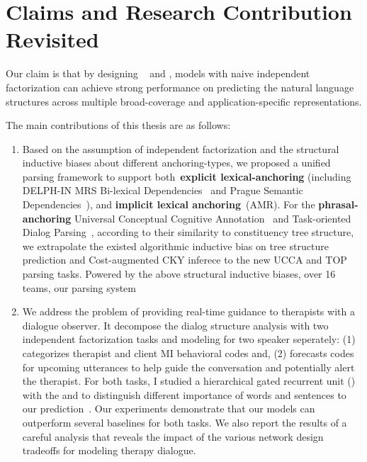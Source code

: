 \section{Claims and Research Contribution Revisited}
\label{sec:conclustions:claims}

 Our claim is that by designing
~ and , models with naive independent factorization can achieve
strong performance on predicting the natural language structures
across multiple broad-coverage and application-specific
representations.

 The main contributions of this thesis are as
follows:

\begin{enumerate}
\item Based on the assumption of independent factorization and the
  structural inductive biases about different anchoring-types, we
  proposed a unified parsing framework to support
  both~\textbf{explicit lexical-anchoring} (including DELPH-IN MRS
  Bi-lexical Dependencies~\citep[DM,][]{ivanova2012did} and Prague
  Semantic
  Dependencies~\citep[PSD,][]{hajic2012announcing,miyao2014house}),
  and \textbf{implicit lexical anchoring}~(AMR). For the
  \textbf{phrasal-anchoring} Universal Conceptual Cognitive
  Annotation~\citep[UCCA,][]{abend2013universal} and Task-oriented
  Dialog Parsing~\citep[TOP,][]{gupta-etal-2018-semantic-parsing},
  according to their similarity to constituency tree structure, we
  extrapolate the existed algorithmic inductive bias on tree structure
  prediction and Cost-augmented CKY inferece to the new UCCA and TOP
  parsing tasks. Powered by the above structural inductive biases,
  over 16 teams, our parsing system~\citep{cao2019amazon} 

\item We address the problem of providing real-time guidance to
  therapists with a dialogue observer. It decompose the dialog
  structure analysis with two independent factorization tasks and
  modeling for two speaker seperately: (1) categorizes therapist and
  client MI behavioral codes and, (2) forecasts codes for upcoming
  utterances to help guide the conversation and potentially alert the
  therapist. For both tasks, I studied a hierarchical gated recurrent
  unit (\HGRU) with the  and
   to distinguish different importance of
  words and sentences to our
  prediction~\citep{jie2019psycdialacl}. Our experiments demonstrate
  that our models can outperform several baselines for both tasks.  We
  also report the results of a careful analysis that reveals the
  impact of the various network design tradeoffs for modeling therapy
  dialogue.


\end{enumerate}
